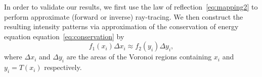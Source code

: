 \documentclass{amsart}
\theoremstyle{lemma}
\theoremstyle{remark}
\begin{document}




In order to validate our results, we first use the law of reflection~\eqref{eq:mapping2} to perform approximate (forward or inverse) ray-tracing.  We then construct the resulting intensity patterns via approximation of the conservation of energy equation equation~\eqref{eq:conservation} by \[f_1(x_i) \Delta x_i \approx f_2(y_i) \Delta y_i,\]\label{econs} where $\Delta x_i$ and $\Delta y_i$ are the areas of the Voronoi regions containing $x_i$ and $y_i = T(x_i)$ respectively. 
\end{document}
